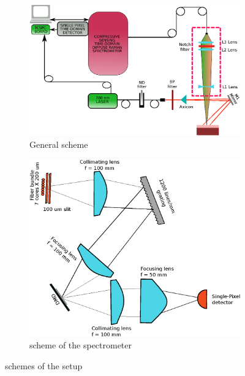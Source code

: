 \documentclass{osa-article}
\begin{document}
\begin{figure}
\begin{subfigure}{\textwidth}
    \centering
    \includegraphics[scale = 0.5]{figure/schemesvg.eps}
    \caption{General scheme}
    \label{fig:complete_setup}
\end{subfigure}
\newline
\begin{subfigure}{\textwidth}
    \centering
    \includegraphics[scale = 0.5]{figure/spectrometer.eps}
    \caption{scheme of the spectrometer}
    \label{fig:spectrometer}
\end{subfigure}
\caption{schemes of the setup}
\label{fig:setup}
\end{figure}
\end{document}
